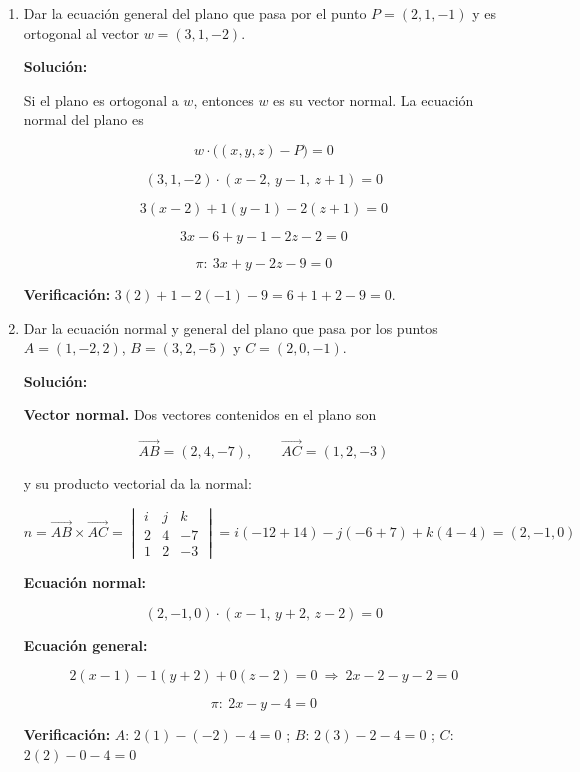 \documentclass[12pt]{article}
\newcommand{\solucion}{%
    \vspace{0.8em}%
    \textbf{Solución:}%
    \vspace{0.8em}%
}
\begin{document}
\begin{enumerate}[label=\alph*.-]

    \item Dar la ecuación general del plano que pasa por el punto
    $P=(2,1,-1)$ y es ortogonal al vector $w=(3,1,-2)$.

    \solucion

    Si el plano es ortogonal a $w$, entonces $w$ es su vector normal. La
    ecuación normal del plano es

    \[
    w\cdot\big((x,y,z)-P\big)=0
    \]

    \[
    (3,1,-2)\cdot(x-2,\,y-1,\,z+1)=0
    \]

    \[
    3(x-2)+1(y-1)-2(z+1)=0
    \]

    \[
    3x-6+y-1-2z-2=0
    \]

    \[
    \boxed{\pi:\ 3x+y-2z-9=0}
    \]

    \textbf{Verificación:} $3(2)+1-2(-1)-9=6+1+2-9=0$. \checkmark

    \item Dar la ecuación normal y general del plano que pasa por los puntos
    $A=(1,-2,2)$, $B=(3,2,-5)$ y $C=(2,0,-1)$.

    \solucion

    \textbf{Vector normal.} Dos vectores contenidos en el plano son

    \[
    \overrightarrow{AB}=(2,4,-7),\qquad \overrightarrow{AC}=(1,2,-3)
    \]

    y su producto vectorial da la normal:

    \[
    n=\overrightarrow{AB}\times\overrightarrow{AC}=\begin{vmatrix}
    i & j & k\\
    2 & 4 & -7\\
    1 & 2 & -3
    \end{vmatrix}
    =i(-12+14)-j(-6+7)+k(4-4)=(2,-1,0)
    \]

    \textbf{Ecuación normal:}

    \[
    \boxed{(2,-1,0)\cdot(x-1,\,y+2,\,z-2)=0}
    \]

    \textbf{Ecuación general:}

    \[
    2(x-1)-1(y+2)+0(z-2)=0\ \Longrightarrow\ 2x-2-y-2=0
    \]

    \[
    \boxed{\pi:\ 2x-y-4=0}
    \]

    \textbf{Verificación:} $A$: $2(1)-(-2)-4=0$ \checkmark;\;
    $B$: $2(3)-2-4=0$ \checkmark;\;
    $C$: $2(2)-0-4=0$ \checkmark


\end{enumerate}
\end{document}
